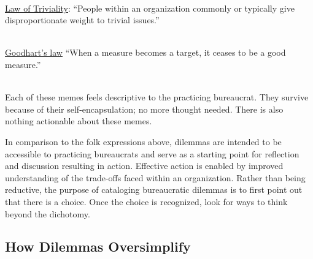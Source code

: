 \ \\
\href{https://en.wikipedia.org/wiki/Law_of_triviality}{Law of Triviality}:
``People within an organization commonly or typically give disproportionate weight to trivial issues.''

\ \\
\href{https://en.wikipedia.org/wiki/Goodhart\%27s_law}{Goodhart's law}
``When a measure becomes a target, it ceases to be a good measure.''

\ \\

Each of these memes feels descriptive to the practicing bureaucrat. They survive because of their self-encapsulation; no more thought needed. There is also nothing actionable about these memes.

In comparison to the folk expressions above, dilemmas are intended to be accessible to practicing bureaucrats and serve as a starting point for reflection and discussion resulting in action. Effective action is enabled by improved understanding of the trade-offs faced within an organization. Rather than being reductive, the purpose of cataloging bureaucratic dilemmas is to first point out that there is a choice. Once the choice is recognized, look for ways to think beyond the dichotomy.

\subsection*{How Dilemmas Oversimplify}

